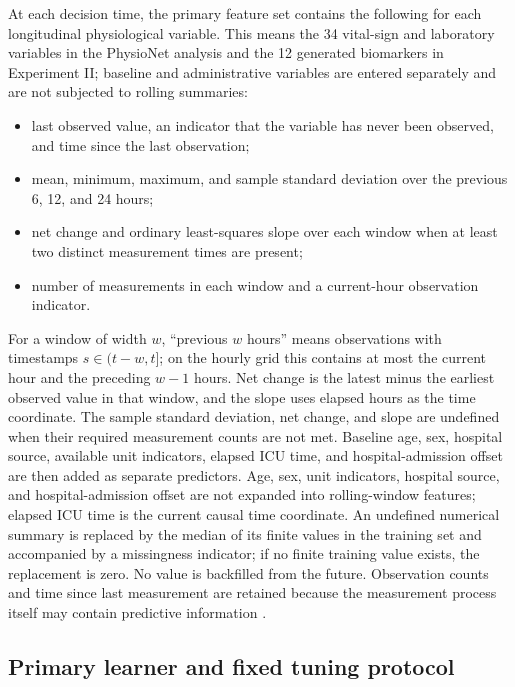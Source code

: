 \documentclass[11pt]{article}
\begin{document}
At each decision time, the primary feature set contains the following for each longitudinal physiological variable. This means the 34 vital-sign and laboratory variables in the PhysioNet analysis and the 12 generated biomarkers in Experiment II; baseline and administrative variables are entered separately and are not subjected to rolling summaries:
\begin{itemize}
    \item last observed value, an indicator that the variable has never been observed, and time since the last observation;
    \item mean, minimum, maximum, and sample standard deviation over the previous 6, 12, and 24 hours;
    \item net change and ordinary least-squares slope over each window when at least two distinct measurement times are present;
    \item number of measurements in each window and a current-hour observation indicator.
\end{itemize}
For a window of width $w$, ``previous $w$ hours'' means observations with timestamps $s\in(t-w,t]$; on the hourly grid this contains at most the current hour and the preceding $w-1$ hours. Net change is the latest minus the earliest observed value in that window, and the slope uses elapsed hours as the time coordinate. The sample standard deviation, net change, and slope are undefined when their required measurement counts are not met. Baseline age, sex, hospital source, available unit indicators, elapsed ICU time, and hospital-admission offset are then added as separate predictors. Age, sex, unit indicators, hospital source, and hospital-admission offset are not expanded into rolling-window features; elapsed ICU time is the current causal time coordinate. An undefined numerical summary is replaced by the median of its finite values in the training set and accompanied by a missingness indicator; if no finite training value exists, the replacement is zero. No value is backfilled from the future. Observation counts and time since last measurement are retained because the measurement process itself may contain predictive information \citep{che2018recurrent}.

\subsection{Primary learner and fixed tuning protocol}
\end{document}
